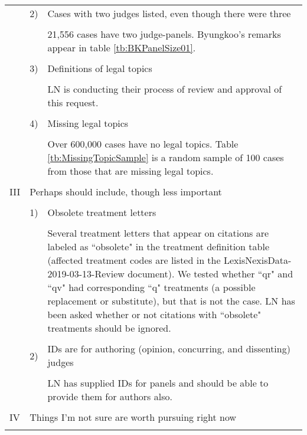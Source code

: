 \documentclass[10pt, letterpaper]{article}
\begin{document}
\begin{spacing}{1.0}
\begin{longtable}{p{0.25in}p{0.25in}p{6in}}
    &2) & Cases with two judges listed, even though there were three\\\\
    & & \color{red}21,556 cases have two judge-panels.  Byungkoo's remarks appear in table \ref{tb:BKPanelSize01}.\\\\

    &3) & Definitions of legal topics\\\\
    & & \color{red} LN is conducting their process of review and approval of this request.\\\\
    
    &4) & Missing legal topics\\\\
    & & \color{red} Over 600,000 cases have no legal topics.  Table \ref{tb:MissingTopicSample} is a random sample of 100 cases from those that are missing legal topics.\\\\
    
    
    
    III & \multicolumn{2}{p{6.25in}}{Perhaps should include, though less important}\\\\
    
    & 1) & Obsolete treatment letters\\\\
    & & \color{red} Several treatment letters that appear on citations are labeled as ``obsolete" in the treatment definition table (affected treatment codes are listed in the LexisNexisData-2019-03-13-Review document).  We tested whether ``qr" and ``qv" had corresponding ``q" treatments (a possible replacement or substitute), but that is not the case.  LN has been asked whether or not citations with ``obsolete" treatments should be ignored.\\\\
    
    & 2) & IDs are for authoring (opinion, concurring, and dissenting) judges\\\\
    & & \color{red} LN has supplied IDs for panels and should be able to provide them for authors also.\\\\
    
    
    
    IV & \multicolumn{2}{p{6.25in}}{Things I'm not sure are worth pursuing right now}\\\\


\end{longtable}
\end{spacing}
\end{document}
